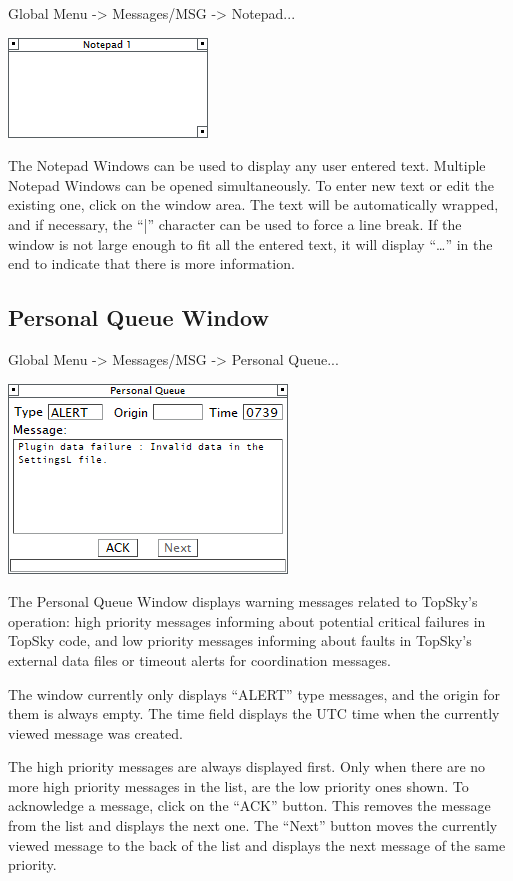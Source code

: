 \documentclass[11pt,a4paper,oldfontcommands]{memoir}
\begin{document}
Global Menu -> Messages/MSG -> Notepad...

\includegraphics{img/note.png}

The Notepad Windows can be used to display any user entered text. Multiple Notepad Windows can be opened simultaneously. To enter new text or edit the existing one, click on the window area. The text will be automatically wrapped, and if necessary, the “|” character can be used to force a line break. If the window is not large enough to fit all the entered text, it will display “…” in the end to indicate that there is more information.

\subsection{Personal Queue Window}
\label{win:pqw}

Global Menu -> Messages/MSG -> Personal Queue...

\includegraphics{img/pq.png}

The Personal Queue Window displays warning messages related to TopSky’s operation: high priority messages informing about potential critical failures in TopSky code, and low priority messages informing about faults in TopSky’s external data files or timeout alerts for coordination messages.

The window currently only displays “ALERT” type messages, and the origin for them is always empty. The time field displays the UTC time when the currently viewed message was created.

The high priority messages are always displayed first. Only when there are no more high priority messages in the list, are the low priority ones shown. To acknowledge a message, click on the “ACK” button. This removes the message from the list and displays the next one. The “Next” button moves the currently viewed message to the back of the list and displays the next message of the same priority.
\end{document}
